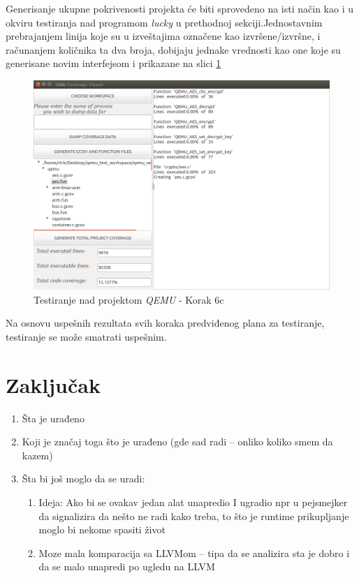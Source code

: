 \documentclass[12pt,oneside]{memoir}
\newcommand{\strano}[1]{\textit{#1}}
\begin{document}
Generisanje ukupne pokrivenosti projekta će biti sprovedeno na isti način kao i u okviru testiranja nad programom \strano{lucky} u prethodnoj sekciji.Jednostavnim prebrajanjem linija koje su u izveštajima označene kao izvršene/izvršne, i računanjem količnika ta dva broja, dobijaju jednake vrednosti kao one koje su generisane novim interfejsom i prikazane na slici \ref{fig:qemu-test-6c}

\begin{figure}[!ht]
  \centering
  \includegraphics[width=\textwidth]{img/qemu-test-6c-ng.png}
  \caption{Testiranje nad projektom \strano{QEMU} - Korak 6c}
  \label{fig:qemu-test-6c}
\end{figure} 

Na osnovu uspešnih rezultata svih koraka predviđenog plana za testiranje, testiranje se može smatrati uspešnim.


\chapter{Zaključak}


\begin{enumerate}
\item Šta je urađeno
\item Koji je značaj toga što je urađeno (gde sad radi – onliko koliko smem da kazem)
\item Šta bi još moglo da se uradi:
\begin{enumerate}
\item Ideja: Ako bi se ovakav jedan alat unapredio I ugradio npr u pejsmejker da signalizira da nešto ne radi kako treba, to što je runtime prikupljanje moglo bi nekome spasiti život
\item Moze mala komparacija sa LLVMom – tipa da se analizira sta je dobro i da se malo unapredi po ugledu na LLVM
\end{enumerate}
\end{enumerate}
\end{document}
